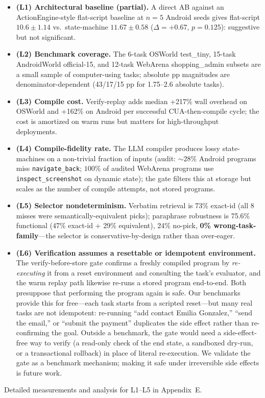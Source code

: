 \documentclass[11pt]{article}
\begin{document}
\begin{itemize}[leftmargin=2em]\tightlist
\item \textbf{(L1) Architectural baseline (partial).} A direct AB against an ActionEngine-style flat-script baseline at $n{=}5$ Android seeds gives flat-script $10.6 \pm 1.14$ vs.\ state-machine $11.67 \pm 0.58$ ($\Delta = +0.67$, $p = 0.125$): suggestive but not significant.
\item \textbf{(L2) Benchmark coverage.} The 6-task OSWorld test\_tiny, 15-task AndroidWorld official-15, and 12-task WebArena shopping\_admin subsets are a small sample of computer-using tasks; absolute pp magnitudes are denominator-dependent (43/17/15 pp for 1.75--2.6 absolute tasks).
\item \textbf{(L3) Compile cost.} Verify-replay adds median +217\% wall overhead on OSWorld and +162\% on Android per successful CUA-then-compile cycle; the cost is amortized on warm runs but matters for high-throughput deployments.
\item \textbf{(L4) Compile-fidelity rate.} The LLM compiler produces lossy state-machines on a non-trivial fraction of inputs (audit: $\sim 28\%$ Android programs miss \texttt{navigate\_back}; $100\%$ of audited WebArena programs use \texttt{inspect\_screenshot} on dynamic state); the gate filters this at storage but scales as the number of compile attempts, not stored programs.
\item \textbf{(L5) Selector nondeterminism.} Verbatim retrieval is 73\% exact-id (all 8 misses were semantically-equivalent picks); paraphrase robustness is 75.6\% functional (47\% exact-id + 29\% equivalent), 24\% no-pick, \textbf{0\% wrong-task-family}---the selector is conservative-by-design rather than over-eager.
\item \textbf{(L6) Verification assumes a resettable or idempotent environment.} The verify-before-store gate confirms a freshly compiled program by \emph{re-executing} it from a reset environment and consulting the task's evaluator, and the warm replay path likewise re-runs a stored program end-to-end. Both presuppose that performing the program again is safe. Our benchmarks provide this for free---each task starts from a scripted reset---but many real tasks are not idempotent: re-running ``add contact Emilia Gonzalez,'' ``send the email,'' or ``submit the payment'' duplicates the side effect rather than re-confirming the goal. Outside a benchmark, the gate would need a side-effect-free way to verify (a read-only check of the end state, a sandboxed dry-run, or a transactional rollback) in place of literal re-execution. We validate the gate as a benchmark mechanism; making it safe under irreversible side effects is future work.
\end{itemize}
Detailed measurements and analysis for L1--L5 in Appendix~E.
\end{document}
